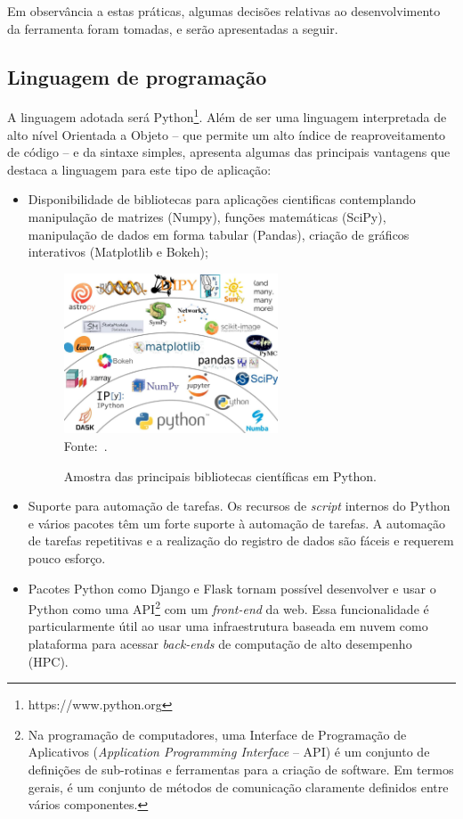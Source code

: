 Em observância a estas práticas, algumas decisões relativas ao desenvolvimento da ferramenta foram tomadas, e serão apresentadas a seguir.


\subsection{Linguagem de programação}

A linguagem adotada será Python\footnote{https://www.python.org}. Além de ser uma linguagem interpretada de alto nível Orientada a Objeto -- que permite um alto índice de reaproveitamento de código -- e da sintaxe simples,  apresenta algumas das principais vantagens que destaca a linguagem para este tipo de aplicação:

\begin{itemize}
    \item Disponibilidade de bibliotecas para aplicações cientificas contemplando manipulação de matrizes (Numpy), funções matemáticas (SciPy), manipulação de dados em forma tabular (Pandas), criação de gráficos interativos (Matplotlib e Bokeh);
    
    \begin{figure}[!ht]
        \centering
        \caption{Amostra das principais bibliotecas científicas em Python.}\label{fig:python_ecosystem}
        \includegraphics[width=0.6\textwidth]{imagens/python_ecosystem}
        \\Fonte:~.
    \end{figure}

    \item Suporte para automação de tarefas. Os recursos de \textit{script} internos do Python e vários pacotes têm um forte suporte à automação de tarefas. A automação de tarefas repetitivas e a realização do registro de dados são fáceis e requerem pouco esforço.
    
    \item Pacotes Python como Django e Flask tornam possível desenvolver e usar o Python como uma API\footnote{Na programação de computadores, uma Interface de Programação de Aplicativos (\textit{Application Programming Interface} -- API) é um conjunto de definições de sub-rotinas e ferramentas para a criação de software. Em termos gerais, é um conjunto de métodos de comunicação claramente definidos entre vários componentes.} com um \textit{front-end} da web. Essa funcionalidade é particularmente útil ao usar uma infraestrutura baseada em nuvem como plataforma para acessar \textit{back-ends} de computação de alto desempenho (HPC).
\end{itemize}


